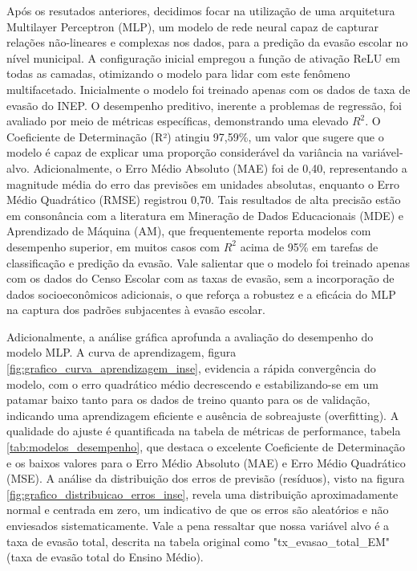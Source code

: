 \documentclass[english, spanish, brazilian]{RBIEarticle} %
\begin{document}
Após os resutados anteriores, decidimos focar na utilização de uma arquitetura Multilayer Perceptron (MLP), um modelo de rede neural capaz de capturar relações não-lineares e complexas nos dados, para a predição da evasão escolar no nível municipal. A configuração inicial empregou a função de ativação ReLU em todas as camadas, otimizando o modelo para lidar com este fenômeno multifacetado. Inicialmente o modelo foi treinado apenas com os dados de taxa de evasão do INEP. O desempenho preditivo, inerente a problemas de regressão, foi avaliado por meio de métricas específicas, demonstrando uma elevado $R^2$. O Coeficiente de Determinação (R²) atingiu 97,59\%, um valor que sugere que o modelo é capaz de explicar uma proporção considerável da variância na variável-alvo. Adicionalmente, o Erro Médio Absoluto (MAE) foi de 0,40, representando a magnitude média do erro das previsões em unidades absolutas, enquanto o Erro Médio Quadrático (RMSE) registrou 0,70. Tais resultados de alta precisão estão em consonância com a literatura em Mineração de Dados Educacionais (MDE) e Aprendizado de Máquina (AM), que frequentemente reporta modelos com desempenho superior, em muitos casos com $R^2$ acima de 95\% em tarefas de classificação e predição da evasão. Vale salientar que o modelo foi treinado apenas com os dados do Censo Escolar com as taxas de evasão, sem a incorporação de dados socioeconômicos adicionais, o que reforça a robustez e a eficácia do MLP na captura dos padrões subjacentes à evasão escolar.

Adicionalmente, a análise gráfica aprofunda a avaliação do desempenho do modelo MLP. A curva de aprendizagem, figura \ref{fig:grafico_curva_aprendizagem_inse}, evidencia a rápida convergência do modelo, com o erro quadrático médio decrescendo e estabilizando-se em um patamar baixo tanto para os dados de treino quanto para os de validação, indicando uma aprendizagem eficiente e ausência de sobreajuste (overfitting). A qualidade do ajuste é quantificada na tabela de métricas de performance, tabela \ref{tab:modelos_desempenho}, que destaca o excelente Coeficiente de Determinação e os baixos valores para o Erro Médio Absoluto (MAE) e Erro Médio Quadrático (MSE). A análise da distribuição dos erros de previsão (resíduos), visto na figura \ref{fig:grafico_distribuicao_erros_inse}, revela uma distribuição aproximadamente normal e centrada em zero, um indicativo de que os erros são aleatórios e não enviesados sistematicamente. Vale a pena ressaltar que nossa variável alvo é a taxa de evasão total, descrita na tabela original como "tx\_evasao\_total\_EM" (taxa de evasão total do Ensino Médio).
\end{document}
